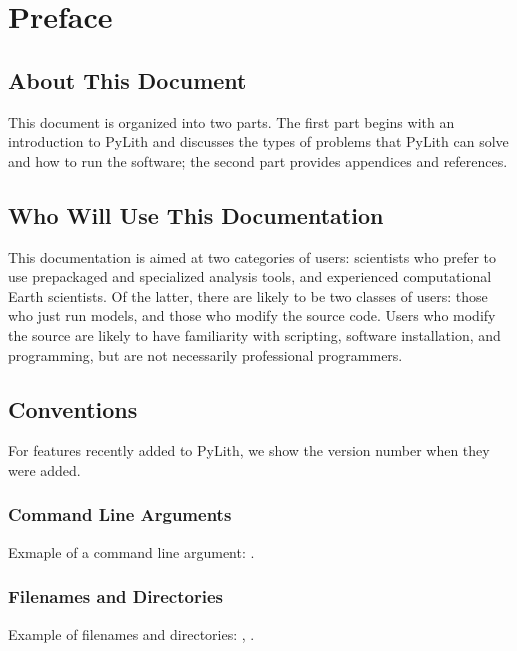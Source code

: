 
\chapter{Preface}


\section{About This Document}

This document is organized into two parts. The first part begins with
an introduction to PyLith and discusses the types of problems that
PyLith can solve and how to run the software; the second part provides
appendices and references.


\section{Who Will Use This Documentation}

This documentation is aimed at two categories of users: scientists
who prefer to use prepackaged and specialized analysis tools, and
experienced computational Earth scientists. Of the latter, there are
likely to be two classes of users: those who just run models, and
those who modify the source code. Users who modify the source are
likely to have familiarity with scripting, software installation,
and programming, but are not necessarily professional programmers.

\section{Conventions}


For features recently added to PyLith, we show the version number when
they were added.\newfeature{\pylithVersion}

\subsection{Command Line Arguments}

Exmaple of a command line argument: .

\subsection{Filenames and Directories}

Example of filenames and directories: , .

